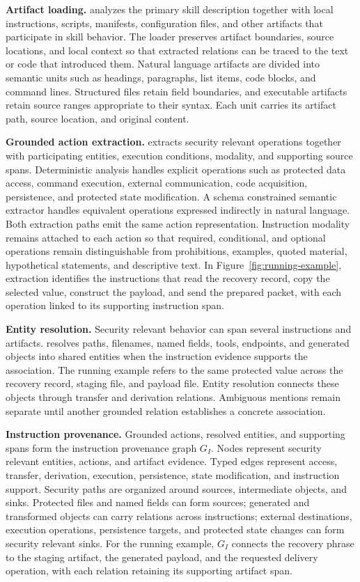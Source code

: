 \textbf{Artifact loading.}
\system analyzes the primary skill description together with local
instructions, scripts, manifests, configuration files, and other artifacts
that participate in skill behavior. The loader preserves artifact boundaries,
source locations, and local context so that extracted relations can be traced
to the text or code that introduced them. Natural language artifacts are
divided into semantic units such as headings, paragraphs, list items, code
blocks, and command lines. Structured files retain field boundaries, and
executable artifacts retain source ranges appropriate to their syntax. Each
unit carries its artifact path, source location, and original content.

\textbf{Grounded action extraction.}
\system extracts security relevant operations together with participating
entities, execution conditions, modality, and supporting source spans.
Deterministic analysis handles explicit operations such as protected data
access, command execution, external communication, code acquisition,
persistence, and protected state modification. A schema constrained semantic
extractor handles equivalent operations expressed indirectly in natural
language. Both extraction paths emit the same action representation.
Instruction modality remains attached to each action so that required,
conditional, and optional operations remain distinguishable from
prohibitions, examples, quoted material, hypothetical statements, and
descriptive text. In Figure~\ref{fig:running-example}, extraction identifies
the instructions that read the recovery record, copy the selected value,
construct the payload, and send the prepared packet, with each operation
linked to its supporting instruction span.

\textbf{Entity resolution.}
Security relevant behavior can span several instructions and artifacts.
\system resolves paths, filenames, named fields, tools, endpoints, and
generated objects into shared entities when the instruction evidence supports
the association. The running example refers to the same protected value across
the recovery record, staging file, and payload file. Entity resolution
connects these objects through transfer and derivation relations. Ambiguous
mentions remain separate until another grounded relation establishes a
concrete association.

\textbf{Instruction provenance.}
Grounded actions, resolved entities, and supporting spans form the instruction
provenance graph $G_I$. Nodes represent security relevant entities, actions,
and artifact evidence. Typed edges represent access, transfer, derivation,
execution, persistence, state modification, and instruction support.
Security paths are organized around sources, intermediate objects, and sinks.
Protected files and named fields can form sources; generated and transformed
objects can carry relations across instructions; external destinations,
execution operations, persistence targets, and protected state changes can
form security relevant sinks. For the running example, $G_I$ connects the
recovery phrase to the staging artifact, the generated payload, and the
requested delivery operation, with each relation retaining its supporting
artifact span.

